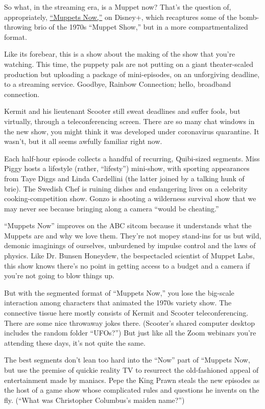 So what, in the streaming era, is a Muppet now? That's the question of,
appropriately,
\href{https://www.nytimes3xbfgragh.onion/2020/07/23/arts/television/muppets-now-disney.html}{``Muppets
Now,''} on Disney+, which recaptures some of the bomb-throwing brio of
the 1970s ``Muppet Show,'' but in a more compartmentalized format.

Like its forebear, this is a show about the making of the show that
you're watching. This time, the puppety pals are not putting on a giant
theater-scaled production but uploading a package of mini-episodes, on
an unforgiving deadline, to a streaming service. Goodbye, Rainbow
Connection; hello, broadband connection.

Kermit and his lieutenant Scooter still sweat deadlines and suffer
fools, but virtually, through a teleconferencing screen. There are so
many chat windows in the new show, you might think it was developed
under coronavirus quarantine. It wasn't, but it all seems awfully
familiar right now.

Each half-hour episode collects a handful of recurring, Quibi-sized
segments. Miss Piggy hosts a lifestyle (rather, ``lifesty'') mini-show,
with sporting appearances from Taye Diggs and Linda Cardellini (the
latter joined by a talking hunk of brie). The Swedish Chef is ruining
dishes and endangering lives on a celebrity cooking-competition show.
Gonzo is shooting a wilderness survival show that we may never see
because bringing along a camera ``would be cheating.''

``Muppets Now'' improves on the ABC sitcom because it understands what
the Muppets are and why we love them. They're not mopey stand-ins for us
but wild, demonic imaginings of ourselves, unburdened by impulse control
and the laws of physics. Like Dr. Bunsen Honeydew, the bespectacled
scientist of Muppet Labs, this show knows there's no point in getting
access to a budget and a camera if you're not going to blow things up.

But with the segmented format of ``Muppets Now,'' you lose the big-scale
interaction among characters that animated the 1970s variety show. The
connective tissue here mostly consists of Kermit and Scooter
teleconferencing. There are some nice throwaway jokes there. (Scooter's
shared computer desktop includes the random folder ``UFOs?'') But just
like all the Zoom webinars you're attending these days, it's not quite
the same.

The best segments don't lean too hard into the ``Now'' part of ``Muppets
Now, but use the premise of quickie reality TV to resurrect the
old-fashioned appeal of entertainment made by maniacs. Pepe the King
Prawn steals the new episodes as the host of a game show whose
complicated rules and questions he invents on the fly. (``What was
Christopher Columbus's maiden name?'')

